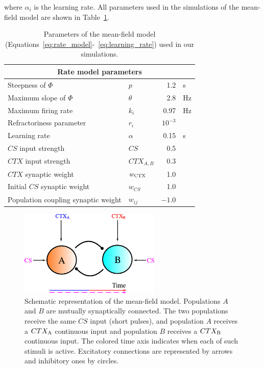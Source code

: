 \noindent where $\alpha_{i}$ is the learning rate. All parameters used in the simulations of the mean-field model are shown in Table~\ref{tab:rate_model}.

\begin{table}[!h]
\caption{Parameters of the mean-field model (Equations~\ref{eq:rate_model}-~\ref{eq:learning_rate}) used in our simulations.}
\centering
\begin{tabular}{llr@{~}l}
\hline
\multicolumn{4}{c}{Rate model parameters}                   \\ \hline
Steepness of $\Phi$          & $p$        & 1.2 & s \\
Maximum slope of $\Phi$             & $\theta$        & 2.8 & Hz \\
Maximum firing rate                & $k_i$        & 0.97 & Hz \\
Refractoriness parameter & $r_i$    & $10^{-3}$ &   \\
Learning rate & $\alpha$    & 0.15 & s \\
$CS$ input strength         & $CS$        & 0.5 \\
$CTX$ input strength          & $CTX_{A,B}$        & 0.3 \\
 $CTX$ synaptic weight           & $w_{\rm CTX}$ & 1.0 &    \\ 
 Initial $CS$ synaptic weight           & $w_{CS}$ & 1.0 &    \\ 
Population coupling synaptic weight          & $w_{ij}$ & $-1.0$ &    \\ \hline
\end{tabular}
\label{tab:rate_model}
\end{table}

\begin{figure}[!ht]
\centering
\includegraphics[width=0.6\textwidth]{figures/ratemodel.pdf}
\caption{\label{fig:esquema_rate} Schematic representation of the mean-field model. Populations $A$ and $B$ are mutually synaptically connected. The two populations receive the same $CS$ input (short pulses), and population $A$ receives a $CTX_{\rm A}$ continuous input and population $B$ receives a $CTX_{\rm B}$ continuous input. The colored time axis indicates when each of such stimuli is active. Excitatory connections are represented by arrows and inhibitory ones by circles.}
\end{figure}

